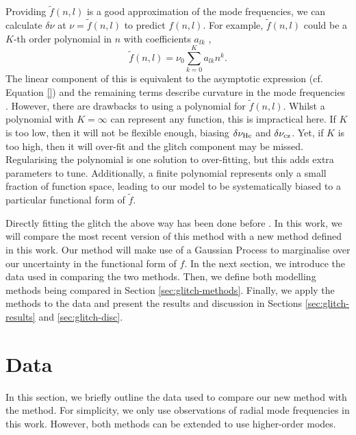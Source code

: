 Providing \(\tilde{f}(n, l)\) is a good approximation of the mode frequencies, we can calculate \(\delta\nu\) at \(\nu = \tilde{f}(n, l)\) to predict \(f(n, l)\). For example, \(\tilde{f}(n,l)\) could be a \(K\)-th order polynomial in \(n\) with coefficients \(a_{lk}\) \citep[e.g.][]{Kjeldsen.Bedding.ea2005,Ulrich1986},
%
\begin{equation}
    \tilde{f}(n, l) = \nu_0 \sum_{k=0}^{K} a_{lk} n^k. \label{eq:poly}
\end{equation}
%
The linear component of this is equivalent to the asymptotic expression (cf. Equation \ref{}) and the remaining terms describe curvature in the mode frequencies . However, there are drawbacks to using a polynomial for \(\tilde{f}(n, l)\). Whilst a polynomial with \(K = \infty\) can represent any function, this is impractical here. If \(K\) is too low, then it will not be flexible enough, biasing \(\delta\nu_{{\mathrm{He}}}\) and \(\delta\nu_{{\mathrm{cz}}}\). Yet, if \(K\) is too high, then it will over-fit and the glitch component may be missed. Regularising the polynomial is one solution to over-fitting, but this adds extra parameters to tune. Additionally, a finite polynomial represents only a small fraction of function space, leading to our model to be systematically biased to a particular functional form of \(\tilde{f}\).


Directly fitting the glitch the above way has been done before \citep[e.g.][]{Verma.Faria.ea2014,Verma.Raodeo.ea2017,Mazumdar.Monteiro.ea2014}. In this work, we will compare the most recent version of this method \citep[][hereafter V19]{Verma.Raodeo.ea2019} with a new method defined in this work. Our method will make use of a Gaussian Process to marginalise over our uncertainty in the functional form of \(f\). In the next section, we introduce the data used in comparing the two methods. Then, we define both modelling methods being compared in Section \ref{sec:glitch-methods}. Finally, we apply the methods to the data and present the results and discussion in Sections \ref{sec:glitch-results} and \ref{sec:glitch-disc}.

\section{Data}\label{sec:glitch-data}

In this section, we briefly outline the data used to compare our new method with the  method. For simplicity, we only use observations of radial mode frequencies in this work. However, both methods can be extended to use higher-order modes.

